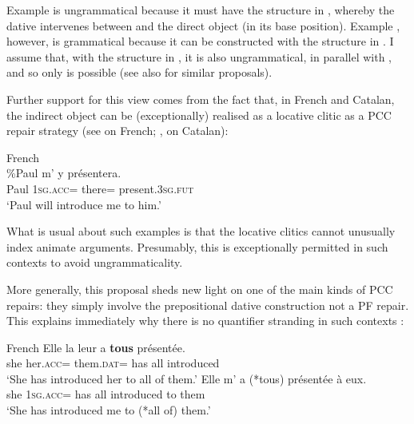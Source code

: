 \documentclass[output=paper,colorlinks,citecolor=brown,nonflat]{langsci/langscibook}
\begin{document}
Example  is ungrammatical because it must have the structure in , whereby the dative intervenes between {\liv} and the direct object (in its base position). Example , however, is grammatical because it can be constructed with the structure in . I assume that, with the structure in , it is also ungrammatical, in parallel with , and so only  is possible (see also \citealt{Anagnostopoulou2003, Rezac2008} for similar proposals).

Further support for this view comes from the fact that, in French and Catalan, the indirect object can be (exceptionally) realised as a locative clitic as a PCC repair strategy (see \citealt{Postal1990, Rezac2008} on French; \citealt{Bonet1991}, \citeyear{Bonet2007} on Catalan):

\ea%
    \label{ex:sheehan:42}
    French\\
    \gll  \%Paul   m’       y       présentera.\\
            Paul   \textsc{1sg}.\textsc{acc}=   there\textsc{=}   present.\textsc{3sg.fut}\\
    \glt   ‘Paul will introduce me to him.’
\z

What is usual about such examples is that the locative clitics cannot unusually index animate arguments. Presumably, this is exceptionally permitted in such contexts to avoid ungrammaticality.

More generally, this proposal sheds new light on one of the main kinds of PCC repairs: they simply involve the prepositional dative construction not a PF repair. This explains immediately why there is no quantifier stranding in such contexts \citep{Kayne1975, Rezac2008}:

\ea%
    \label{ex:sheehan:43}
    French \citep[98]{Rezac2008}
    \ea\label{ex:sheehan:43a}
    \gll    Elle   la   leur   a   \textbf{tous}   présentée.\\
            she   her.\textsc{acc}=  them.\textsc{dat}=   has   all   introduced\\
    \glt   ‘She has introduced her to all of them.’
    \ex\label{ex:sheehan:43b}
    \gll    Elle m'   a   (*tous)   présentée     à   eux.\\
          she \textsc{1sg}.\textsc{acc}= has   all     introduced  to   them\\
    \glt     ‘She has introduced me to (*all of) them.’
    \z
\z
\end{document}
